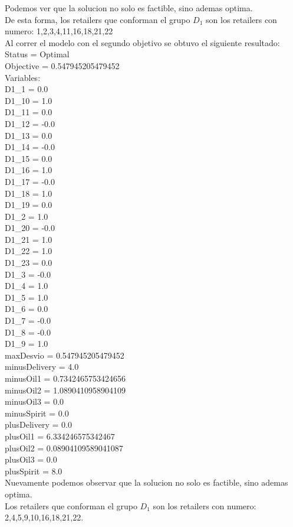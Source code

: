 Podemos ver que la solucion no solo es factible, sino ademas optima.\\
De esta forma, los retailers que conforman el grupo $D_{1}$ son los retailers con numero: 1,2,3,4,11,16,18,21,22\\

Al correr el modelo con el segundo objetivo se obtuvo el siguiente resultado: \\

Status = Optimal \\
Objective = 0.547945205479452 \\
Variables: \\
D1\_1 = 0.0 \\
D1\_10 = 1.0 \\
D1\_11 = 0.0 \\
D1\_12 = -0.0 \\
D1\_13 = 0.0 \\
D1\_14 = -0.0 \\
D1\_15 = 0.0 \\
D1\_16 = 1.0 \\
D1\_17 = -0.0 \\
D1\_18 = 1.0 \\
D1\_19 = 0.0 \\
D1\_2 = 1.0 \\
D1\_20 = -0.0 \\
D1\_21 = 1.0 \\
D1\_22 = 1.0 \\
D1\_23 = 0.0 \\
D1\_3 = -0.0 \\
D1\_4 = 1.0 \\
D1\_5 = 1.0 \\
D1\_6 = 0.0 \\
D1\_7 = -0.0 \\
D1\_8 = -0.0 \\
D1\_9 = 1.0 \\
maxDesvio = 0.547945205479452 \\
minusDelivery = 4.0 \\
minusOil1 = 0.7342465753424656 \\
minusOil2 = 1.0890410958904109 \\
minusOil3 = 0.0 \\
minusSpirit = 0.0 \\
plusDelivery = 0.0 \\
plusOil1 = 6.334246575342467 \\
plusOil2 = 0.08904109589041087 \\
plusOil3 = 0.0 \\
plusSpirit = 8.0 \\

Nuevamente podemos observar que la solucion no solo es factible, sino ademas optima.\\
Los retailers que conforman el grupo $D_1$ son los retailers con numero: 2,4,5,9,10,16,18,21,22.
